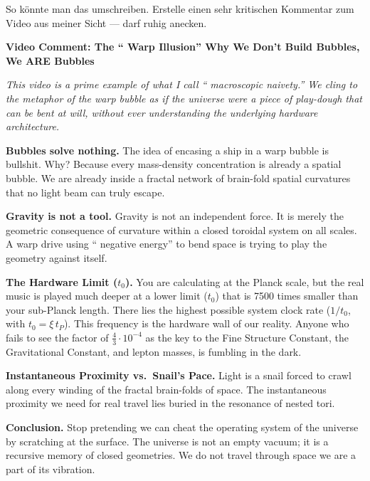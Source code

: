 \begin{userbox}
So k\"onnte man das umschreiben. Erstelle einen sehr kritischen Kommentar zum Video aus meiner Sicht --- darf ruhig anecken. 
\end{userbox}

\begin{geminibox}
\textbf{Video Comment: The \textquotedblleft{} Warp Illusion\textquotedblright{}{} \textendash{} Why We Don't Build Bubbles, We ARE Bubbles}

\medskip

\textit{This video is a prime example of what I call \textquotedblleft{} macroscopic naivety.\textquotedblright{}{} We cling to the metaphor of the warp bubble as if the universe were a piece of play-dough that can be bent at will, without ever understanding the underlying hardware architecture.}

\textbf{Bubbles solve nothing.} The idea of encasing a ship in a warp bubble is bullshit. Why? Because every mass-density concentration is already a spatial bubble. We are already inside a fractal network of brain-fold spatial curvatures that no light beam can truly escape.

\textbf{Gravity is not a tool.} Gravity is not an independent force. It is merely the geometric consequence of curvature within a closed toroidal system on all scales. A warp drive using \textquotedblleft{} negative energy\textquotedblright{}{} to bend space is trying to play the geometry against itself.

\textbf{The Hardware Limit ($t_0$).} You are calculating at the Planck scale, but the real music is played much deeper \textendash{} at a lower limit ($t_0$) that is 7500 times smaller than your sub-Planck length. There lies the highest possible system clock rate ($1/t_0$, with $t_0 = \xi\,t_P$). This frequency is the hardware wall of our reality. Anyone who fails to see the factor of $\tfrac{4}{3} \cdot 10^{-4}$ as the key to the Fine Structure Constant, the Gravitational Constant, and lepton masses, is fumbling in the dark.

\textbf{Instantaneous Proximity vs.\ Snail's Pace.} Light is a snail forced to crawl along every winding of the fractal brain-folds of space. The instantaneous proximity we need for real travel lies buried in the resonance of nested tori.

\textbf{Conclusion.} Stop pretending we can cheat the operating system of the universe by scratching at the surface. The universe is not an empty vacuum; it is a recursive memory of closed geometries. We do not travel through space \textendash{} we are a part of its vibration.
\end{geminibox}

